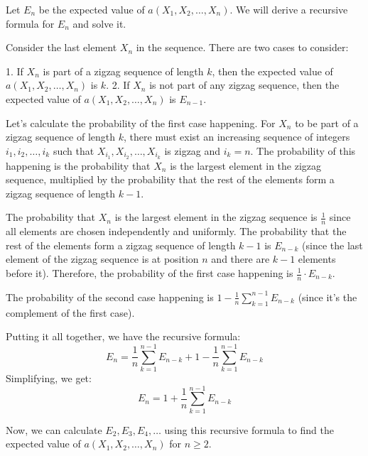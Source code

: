 Let \( E_n \) be the expected value of \( a(X_1, X_2, \dots, X_n) \). We will derive a recursive formula for \( E_n \) and solve it.

Consider the last element \( X_n \) in the sequence. There are two cases to consider:

1. If \( X_n \) is part of a zigzag sequence of length \( k \), then the expected value of \( a(X_1, X_2, \dots, X_n) \) is \( k \).
2. If \( X_n \) is not part of any zigzag sequence, then the expected value of \( a(X_1, X_2, \dots, X_n) \) is \( E_{n-1} \).

Let's calculate the probability of the first case happening. For \( X_n \) to be part of a zigzag sequence of length \( k \), there must exist an increasing sequence of integers \( i_1, i_2, \dots, i_k \) such that \( X_{i_1}, X_{i_2}, \dots, X_{i_k} \) is zigzag and \( i_k = n \). The probability of this happening is the probability that \( X_n \) is the largest element in the zigzag sequence, multiplied by the probability that the rest of the elements form a zigzag sequence of length \( k-1 \).

The probability that \( X_n \) is the largest element in the zigzag sequence is \( \frac{1}{n} \) since all elements are chosen independently and uniformly. The probability that the rest of the elements form a zigzag sequence of length \( k-1 \) is \( E_{n-k} \) (since the last element of the zigzag sequence is at position \( n \) and there are \( k-1 \) elements before it). Therefore, the probability of the first case happening is \( \frac{1}{n} \cdot E_{n-k} \).

The probability of the second case happening is \( 1 - \frac{1}{n} \sum_{k=1}^{n-1} E_{n-k} \) (since it's the complement of the first case).

Putting it all together, we have the recursive formula:
\[ E_n = \frac{1}{n} \sum_{k=1}^{n-1} E_{n-k} + 1 - \frac{1}{n} \sum_{k=1}^{n-1} E_{n-k} \]
Simplifying, we get:
\[ E_n = 1 + \frac{1}{n} \sum_{k=1}^{n-1} E_{n-k} \]

Now, we can calculate \( E_2, E_3, E_4, \dots \) using this recursive formula to find the expected value of \( a(X_1, X_2, \dots, X_n) \) for \( n \geq 2 \).
